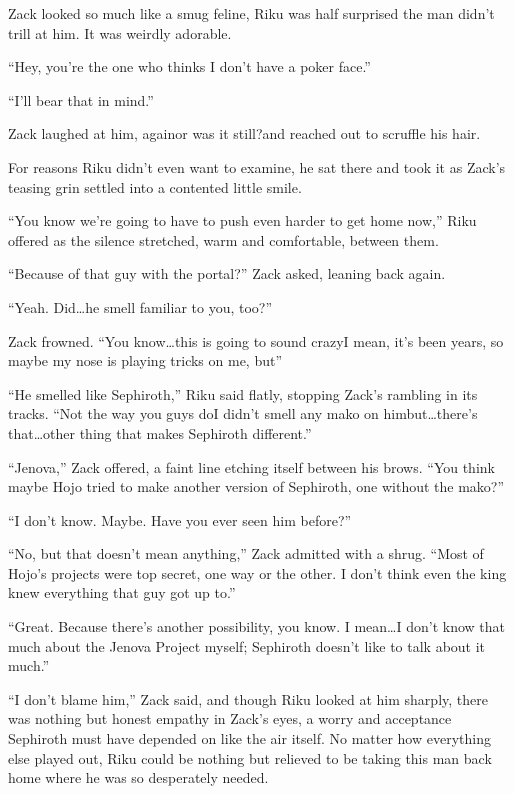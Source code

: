 Zack looked so much like a smug feline, Riku was half surprised the man didn't trill at him. It was weirdly adorable.

``Hey, you're the one who thinks I don't have a poker face.''

``I'll bear that in mind.''

Zack laughed at him, again\textemdash or was it still?\textemdash and reached out to scruffle his hair.

For reasons Riku didn't even want to examine, he sat there and took it as Zack's teasing grin settled into a contented little smile.

``You know we're going to have to push even harder to get home now,'' Riku offered as the silence stretched, warm and comfortable, between them.

``Because of that guy with the portal?'' Zack asked, leaning back again.

``Yeah. Did\ldots he smell familiar to you, too?''

Zack frowned. ``You know\ldots this is going to sound crazy\textemdash I mean, it's been years, so maybe my nose is playing tricks on me, but\textemdash''

``He smelled like Sephiroth,'' Riku said flatly, stopping Zack's rambling in its tracks. ``Not the way you guys do\textemdash I didn't smell any mako on him\textemdash but\ldots there's that\ldots other thing that makes Sephiroth different.''

``Jenova,'' Zack offered, a faint line etching itself between his brows. ``You think maybe Hojo tried to make another version of Sephiroth, one without the mako?''

``I don't know. Maybe. Have you ever seen him before?''

``No, but that doesn't mean anything,'' Zack admitted with a shrug. ``Most of Hojo's projects were top secret, one way or the other. I don't think even the king knew everything that guy got up to.''

``Great. Because there's another possibility, you know. I mean\ldots I don't know that much about the Jenova Project myself; Sephiroth doesn't like to talk about it much.''

``I don't blame him,'' Zack said, and though Riku looked at him sharply, there was nothing but honest empathy in Zack's eyes, a worry and acceptance Sephiroth must have depended on like the air itself. No matter how everything else played out, Riku could be nothing but relieved to be taking this man back home where he was so desperately needed.

